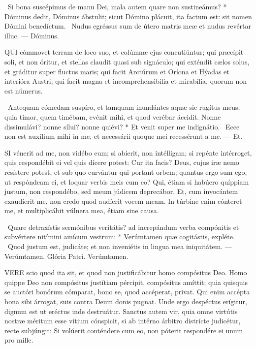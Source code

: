 \R\ Si bona suscépimus de manu Dei, mala autem quare non sustineámus? * Dóminus dedit, Dóminus ábstulit; sicut Dómino plácuit, ita factum est: sit nomen Dómini benedíctum. \V\ Nudus egréssus sum de útero matris meæ et nudus revértar illuc. — Dóminus.


\lettrine[lines=2]{Q}{UI} cómmovet terram de loco suo, et colúmnæ ejus concutiúntur; qui præcípit soli, et non óritur, et stellas claudit quasi sub signáculo; qui exténdit cælos solus, et gráditur super fluctus maris; qui facit Arctúrum et Oríona et Hýadas et interióra Austri; qui facit magna et incomprehensibília et mirabília, quorum non est númerus.

\R\ Antequam cómedam suspíro, et tamquam inundántes aquæ sic rugítus meus; quia timor, quem timébam, evénit mihi, et quod verébar áccidit. Nonne dissimulávi? nonne sílui? nonne quiévi? * Et venit super me indignátio. \V\ Ecce non est auxílium mihi in me, et necessárii quoque mei recessérunt a me. — Et.


\lettrine[lines=2]{S}{I} vénerit ad me, non vidébo eum; si abíerit, non intélligam; si repénte intérroget, quis respondébit ei vel quis dícere potest: Cur ita facis? Deus, cujus iræ nemo resístere potest, et sub quo curvántur qui portant orbem; quantus ergo sum ego, ut respóndeam ei, et loquar verbis meis cum eo? Qui, étiam si habúero quíppiam justum, non respondébo, sed meum júdicem deprecábor. Et, cum invocántem exaudíerit me, non credo quod audíerit vocem meam. In túrbine enim cónteret me, et multiplicábit vúlnera mea, étiam sine causa.

\R\ Quare detraxístis sermónibus veritátis? ad increpándum verba compónitis et subvértere nitímini amícum vestrum: * Verúmtamen quæ cogitástis, expléte. \V\ Quod justum est, judicáte; et non inveniétis in lingua mea iniquitátem. — Verúmtamen. Glória Patri. Verúmtamen.




\lettrine[lines=2]{V}{ERE} scio quod ita sit, et quod non justificábitur homo compósitus Deo. Homo quippe Deo non compósitus justítiam pércipit, compósitus amíttit; quia quisquis se auctóri bonórum cómparat, bono se, quod accéperat, privat. Qui enim accépta bona sibi árrogat, suis contra Deum donis pugnat. Unde ergo despéctus erígitur, dignum est ut eréctus inde destruátur. Sanctus autem vir, quia omne virtútis nostræ méritum esse vítium cónspicit, si ab intérno árbitro distrícte judicétur, recte subjúngit: Si volúerit conténdere cum eo, non póterit respondére ei unum pro mille.

